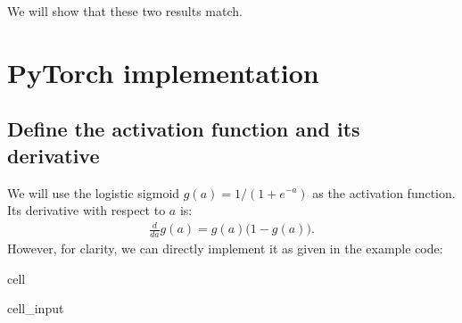 \documentclass[letterpaper,10pt,english]{jupyterBook}
\begin{document}
\sphinxAtStartPar
We will show that these two results match.


\section{PyTorch implementation}
\label{\detokenize{04:pytorch-implementation}}

\subsection{Define the activation function and its derivative}
\label{\detokenize{04:define-the-activation-function-and-its-derivative}}
\sphinxAtStartPar
We will use the logistic sigmoid \(g(a) = 1 / (1 + e^{-a})\) as the activation function. Its derivative with respect to \(a\) is:
\begin{equation*}
\begin{split}\frac{d}{da} g(a) = g(a) \bigl(1 - g(a)\bigr).\end{split}
\end{equation*}
\sphinxAtStartPar
However, for clarity, we can directly implement it as given in the example code:

\begin{sphinxuseclass}{cell}\begin{sphinxVerbatimInput}

\begin{sphinxuseclass}{cell_input}
\begin{sphinxVerbatim}[commandchars=\\\{\}]
         

         
\end{sphinxVerbatim}

\end{sphinxuseclass}\end{sphinxVerbatimInput}

\end{sphinxuseclass}
\end{document}
